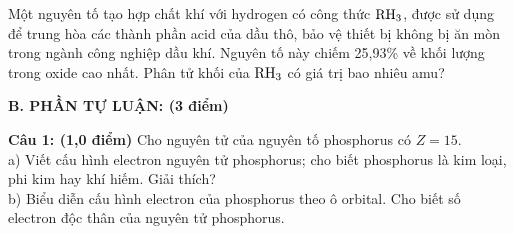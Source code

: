 \documentclass[11pt,a4paper]{article}
\begin{document}
\begin{ex}
Một nguyên tố tạo hợp chất khí với hydrogen có công thức $\ce{RH3}$, được sử dụng để trung hòa các thành phần acid của dầu thô, bảo vệ thiết bị không bị ăn mòn trong ngành công nghiệp dầu khí. Nguyên tố này chiếm 25,93\% về khối lượng trong oxide cao nhất. Phân tử khối của $\ce{RH3}$ có giá trị bao nhiêu amu?

\end{ex}
\vspace{6pt}
\noindent
{\color{mainGreen}\textbf{\Large B. PHẦN TỰ LUẬN: (3 điểm)}}
\vspace{2pt}

\noindent
\textbf{Câu 1: (1,0 điểm)} Cho nguyên tử của nguyên tố phosphorus có $Z = 15$.\\
a) Viết cấu hình electron nguyên tử phosphorus; cho biết phosphorus là kim loại, phi kim hay khí hiếm. Giải thích?\\
b) Biểu diễn cấu hình electron của phosphorus theo ô orbital. Cho biết số electron độc thân của nguyên tử phosphorus.
\end{document}
